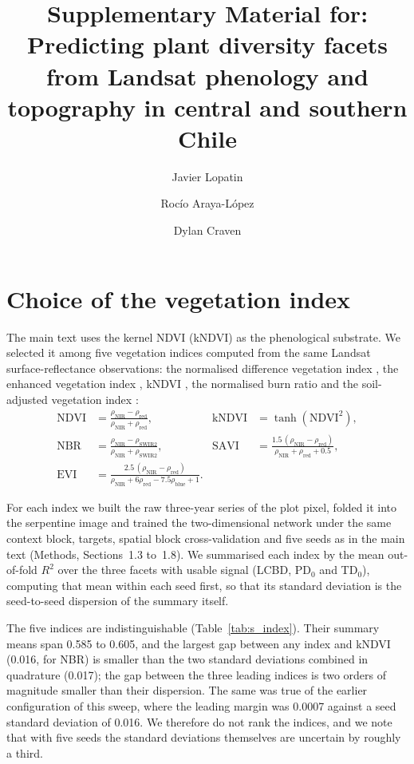 \documentclass[preprint,12pt]{elsarticle}
\title{Supplementary Material for: Predicting plant diversity facets from Landsat phenology and topography in central and southern Chile}
\author[1,2,3]{Javier Lopatin\corref{cor1}}
\author[4]{Rocío Araya-López}
\author[2,5]{Dylan Craven}
\begin{document}
\begin{frontmatter}
\end{frontmatter}

\linenumbers

\section{Choice of the vegetation index}
\label{sec:s_index}

The main text uses the kernel NDVI (kNDVI) as the phenological substrate. We selected it
among five vegetation indices computed from the same Landsat surface-reflectance
observations: the normalised difference vegetation index \citep{tucker1979red}, the
enhanced vegetation index \citep{huete2002overview}, kNDVI \citep{campsvalls2021kndvi},
the normalised burn ratio \citep{key2006landscape} and the soil-adjusted vegetation index
\citep{huete1988savi}:
\begin{align}
\mathrm{NDVI} &= \frac{\rho_\mathrm{NIR} - \rho_\mathrm{red}}{\rho_\mathrm{NIR} + \rho_\mathrm{red}}, &
\mathrm{kNDVI} &= \tanh\!\left(\mathrm{NDVI}^2\right), \\
\mathrm{NBR} &= \frac{\rho_\mathrm{NIR} - \rho_\mathrm{SWIR2}}{\rho_\mathrm{NIR} + \rho_\mathrm{SWIR2}}, &
\mathrm{SAVI} &= \frac{1.5\,(\rho_\mathrm{NIR} - \rho_\mathrm{red})}{\rho_\mathrm{NIR} + \rho_\mathrm{red} + 0.5}, \\
\mathrm{EVI} &= \frac{2.5\,(\rho_\mathrm{NIR} - \rho_\mathrm{red})}{\rho_\mathrm{NIR} + 6\rho_\mathrm{red} - 7.5\rho_\mathrm{blue} + 1}.
\end{align}

For each index we built the raw three-year series of the plot pixel, folded it into the
serpentine image and trained the two-dimensional network under the same context block,
targets, spatial block cross-validation and five seeds as in the main text (Methods,
Sections~1.3 to~1.8). We summarised each index by the mean out-of-fold $R^2$ over the three
facets with usable signal (LCBD, PD$_0$ and TD$_0$), computing that mean within each seed
first, so that its standard deviation is the seed-to-seed dispersion of the summary itself.

The five indices are indistinguishable (Table~\ref{tab:s_index}). Their summary means span
0.585 to 0.605, and the largest gap between any index and kNDVI (0.016, for NBR) is smaller
than the two standard deviations combined in quadrature (0.017); the gap between the three
leading indices is two orders of magnitude smaller than their dispersion. The same was true
of the earlier configuration of this sweep, where the leading margin was 0.0007 against a
seed standard deviation of 0.016. We therefore do not rank the indices, and we note that
with five seeds the standard deviations themselves are uncertain by roughly a third.
\end{document}
